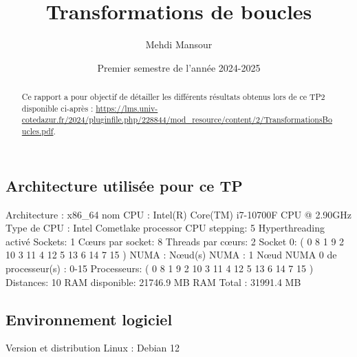 \documentclass{rapport}
\title{Transformations de boucles}
\author{Mehdi Mansour}
\date{Premier semestre de l'année 2024-2025}
\begin{document}
  \maketitle

  \begin{abstract}
    Ce rapport a pour objectif de détailler les différents résultats obtenus lors de ce TP2 disponible ci-après : \url{https://lms.univ-cotedazur.fr/2024/pluginfile.php/228844/mod_resource/content/2/TransformationsBoucles.pdf}.
     \end{abstract}
\subsection*{Architecture utilisée pour ce TP}
     \noindent
     Architecture : x86\_64
     \newline
      \noindent
     nom CPU :	Intel(R) Core(TM) i7-10700F CPU @ 2.90GHz
     \newline
     Type de CPU :	Intel Cometlake processor
     \newline
     CPU stepping:	5
     \newline
     Hyperthreading activé
     \newline
     Sockets:		1
     \newline
     Cœurs par socket:	8
     \newline
     Threads par cœurs:	2
     \newline
     Socket 0:		( 0 8 1 9 2 10 3 11 4 12 5 13 6 14 7 15 )
     \newline
     \newline
     NUMA :
     \newline \indent
         Nœud(s) NUMA : 1
          \newline \indent
         Nœud NUMA 0 de processeur(s) : 0-15
     \newline
     Processeurs:		( 0 8 1 9 2 10 3 11 4 12 5 13 6 14 7 15 )
     \newline
     Distances:		10
     \newline
     RAM disponible:		21746.9 MB
     \newline
     RAM Total :		31991.4 MB
 \subsection*{Environnement logiciel}
 Version et distribution Linux : Debian 12
\end{document}
